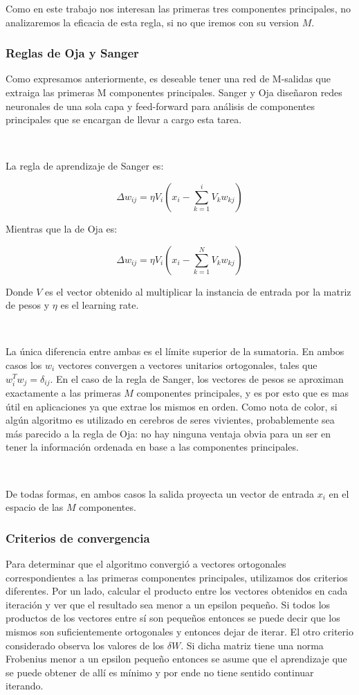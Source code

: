 \documentclass[informe.tex]{subfiles}
\begin{document}
	Como en este trabajo nos interesan las primeras tres componentes principales, no analizaremos la eficacia de esta regla, si no que iremos con su version $M$.
      
      \subsubsection{Reglas de Oja y Sanger}
	Como expresamos anteriormente, es deseable tener una red de M-salidas que extraiga las primeras M componentes principales. Sanger y Oja diseñaron redes neuronales de una sola capa y feed-forward para análisis de componentes principales que se encargan de llevar a cargo esta tarea.
	
	~
	
	La regla de aprendizaje de Sanger es:

	$$\Delta w_{ij} = \eta V_i(x_i - \sum_{k=1}^{i} V_k w_{kj} )$$

	Mientras que la de Oja es:

	$$\Delta w_{ij} = \eta V_i(x_i - \sum_{k=1}^{N} V_k w_{kj} )$$
	
	Donde $V$ es el vector obtenido al multiplicar la instancia de entrada por la matriz de pesos y $\eta$ es el learning rate.
	
	~

	La única diferencia entre ambas es el límite superior de la sumatoria. En ambos casos los $w_i$ vectores convergen a vectores unitarios ortogonales, tales que $w^{T}_i w_j = \delta_{ij}$. En el caso de la regla de Sanger, los vectores de pesos se aproximan exactamente a las primeras $M$ componentes principales, y es por esto que es mas \'util en aplicaciones ya que extrae los mismos en orden. Como nota de color, si algún algoritmo es utilizado en cerebros de seres vivientes, probablemente sea más parecido a la regla de Oja: no hay ninguna ventaja obvia para un ser en tener la información ordenada en base a las componentes principales. 
	
	~

	De todas formas, en ambos casos la salida proyecta un vector de entrada $x_i$ en el espacio de las $M$ componentes.
	
      \subsubsection{Criterios de convergencia}
	Para determinar que el algoritmo convergió a vectores ortogonales correspondientes a las primeras componentes principales, utilizamos dos criterios diferentes. Por un lado, calcular el producto entre los vectores obtenidos en cada iteración y ver que el resultado sea menor a un epsilon pequeño. Si todos los productos de los vectores entre sí son pequeños entonces se puede decir que los mismos son suficientemente ortogonales y entonces dejar de iterar. El otro criterio considerado observa los valores de los $\delta W$. Si dicha matriz tiene una norma Frobenius menor a un epsilon pequeño entonces se asume que el aprendizaje que se puede obtener de allí es mínimo y por ende no tiene sentido continuar iterando.
	
\end{document}
